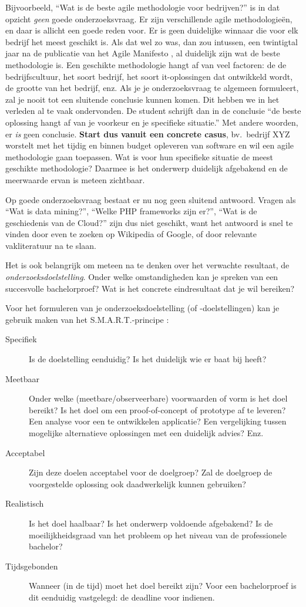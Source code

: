 Bijvoorbeeld, ``Wat is de beste agile methodologie voor bedrijven?'' is in dat opzicht \textit{geen} goede onderzoeksvraag. Er zijn verschillende agile methodologieën, en daar is allicht een goede reden voor. Er is geen duidelijke winnaar die voor elk bedrijf het meest geschikt is. Als dat wel zo was, dan zou intussen, een twintigtal jaar na de publicatie van het Agile Manifesto \autocite{BeckEtAl2001}, al duidelijk zijn wat de beste methodologie is. Een geschikte methodologie hangt af van veel factoren: de de bedrijfscultuur, het soort bedrijf, het soort it-oplossingen dat ontwikkeld wordt, de grootte van het bedrijf, enz. Als je je onderzoeksvraag te algemeen formuleert, zal je nooit tot een sluitende conclusie kunnen komen. Dit hebben we in het verleden al te vaak ondervonden. De student schrijft dan in de conclusie ``de beste oplossing hangt af van je voorkeur en je specifieke situatie.'' Met andere woorden, er \textit{is} geen conclusie. \textbf{Start dus vanuit een concrete casus}, bv.\ bedrijf XYZ worstelt met het tijdig en binnen budget opleveren van software en wil een agile methodologie gaan toepassen. Wat is voor hun specifieke situatie de meest geschikte methodologie? Daarmee is het onderwerp duidelijk afgebakend en de meerwaarde ervan is meteen zichtbaar.

Op goede onderzoeksvraag bestaat er nu nog geen sluitend antwoord. Vragen als ``Wat is data mining?'', ``Welke PHP frameworks zijn er?'', ``Wat is de geschiedenis van de Cloud?'' zijn dus niet geschikt, want het antwoord is snel te vinden door even te zoeken op Wikipedia of Google, of door relevante vakliteratuur na te slaan.

Het is ook belangrijk om meteen na te denken over het verwachte resultaat, de \textit{onderzoeksdoelstelling}. Onder welke omstandigheden kan je spreken van een succesvolle bachelorproef? Wat is het concrete eindresultaat dat je wil bereiken?

Voor het formuleren van je onderzoeksdoelstelling (of -doelstellingen) kan je gebruik maken van het S.M.A.R.T.-principe \autocite{UchelenJungjohann2003}:

\begin{description}
  \item[Specifiek] Is de doelstelling eenduidig? Is het duidelijk wie er baat bij heeft?
  \item[Meetbaar] Onder welke (meetbare/observeerbare) voorwaarden of vorm is het doel bereikt? Is het doel om een proof-of-concept of prototype af te leveren? Een analyse voor een te ontwikkelen applicatie? Een vergelijking tussen mogelijke alternatieve oplossingen met een duidelijk advies? Enz.
  \item[Acceptabel] Zijn deze doelen acceptabel voor de doelgroep? Zal de doelgroep de voorgestelde oplossing ook daadwerkelijk kunnen gebruiken?
  \item[Realistisch] Is het doel haalbaar? Is het onderwerp voldoende afgebakend? Is de moeilijkheidsgraad van het probleem op het niveau van de professionele bachelor?
  \item[Tijdsgebonden] Wanneer (in de tijd) moet het doel bereikt zijn? Voor een bachelorproef is dit eenduidig vastgelegd: de deadline voor indienen.
\end{description}

